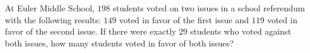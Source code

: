 At Euler Middle School, $198$ students voted on two issues in a school referendum with the following results: $149$ voted in favor of the first issue and $119$ voted in favor of the second issue. If there were exactly $29$ students who voted against both issues, how many students voted in favor of both issues?
